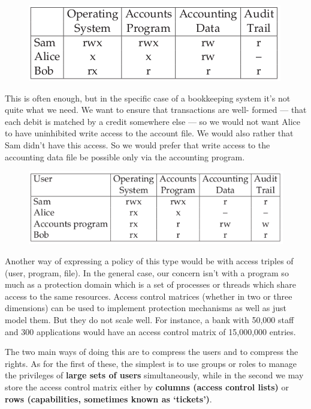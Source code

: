 		\begin{figure}[H]
			\includegraphics[scale=0.6]{pics/access1.png}
		\end{figure}

		This is often enough, but in the specific case of a bookkeeping system
		it’s not quite what we need. We want to ensure that transactions are well-
		formed — that each debit is matched by a credit somewhere else — so we
		would not want Alice to have uninhibited write access to the account file.
		We would also rather that Sam didn’t have this access. So we would prefer
		that write access to the accounting data file be possible only via the accounting
		program. 

		\begin{figure}[H]
			\includegraphics[scale=0.6]{pics/access2.png}
		\end{figure}

		Another way of expressing a policy of this type would be with access triples
		of (user, program, file). In the general case, our concern isn’t with a program
		so much as a protection domain which is a set of processes or threads which
		share access to the same resources.
		Access control matrices (whether in two or three dimensions) can be used to
		implement protection mechanisms as well as just model them. But they do not
		scale well. For instance, a bank with 50,000 staff and 300 applications would
		have an access control matrix of 15,000,000 entries. 

		The two main ways of doing this are to compress the users and to compress the rights. 
		As for the first of these, the 	simplest is to use groups or roles to manage the 
		privileges of {\bf large sets of users} simultaneously, while in the second we may 
		store the access control matrix
		either by {\bf columns (access control lists)} or {\bf rows (capabilities, sometimes known
		as ‘tickets’)}.

